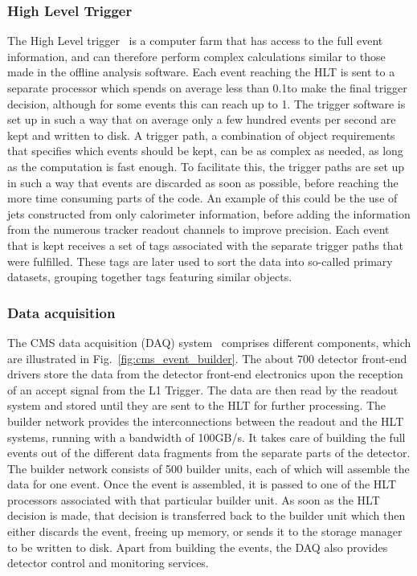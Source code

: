 \subsubsection{High Level Trigger \label{sec:cms_hlt}}

The High Level trigger~\cite{Adam:2005zf} is a computer farm that has access to the full event
information, and can therefore perform complex calculations similar to those made in the offline
analysis software. 
Each event reaching the HLT is sent to a separate processor which spends on average less than
0.1\second to make the final trigger decision, although for some events this can reach up to
1\second. 
The trigger software is set up in such a way that on average only a few hundred events per second
are kept and written to disk. 
A trigger path, a combination of object requirements that specifies which events should
be kept, can be as complex as needed, as long as the computation is fast enough. 
To facilitate this, the trigger paths are set up in such a way that events are discarded as soon as
possible, before reaching the more time consuming parts of the code. 
An example of this could be the use of jets constructed from only calorimeter information, before
adding the information from the numerous tracker readout channels to improve precision. 
Each event that is kept receives a set of tags associated with the separate trigger paths that were
fulfilled. These tags are later used to sort the data into so-called primary datasets, grouping
together tags featuring similar objects. 


\subsubsection{Data acquisition \label{sec:cms_daq}}

The CMS data acquisition (DAQ) system~\cite{Cittolin:578006} comprises different components, which
are illustrated in Fig.~\ref{fig:cms_event_builder}. 
The about 700 detector front-end drivers store the data from the detector front-end electronics upon
the reception of an accept signal from the L1 Trigger. The data are then read by the readout system
and stored until they are sent to the HLT for further processing. 
The builder network provides the interconnections between the readout and the HLT systems, running
with a bandwidth of 100\unit{GB/s}. It takes care of building the full events out of the different
data fragments from the separate parts of the detector. The builder network consists of 500 builder
units, each of which will assemble the data for one event. 
Once the event is assembled, it is passed to one of the HLT processors associated with that
particular builder unit. 
As soon as the HLT decision is made, that decision is transferred back to the builder
unit which then either discards the event, freeing up memory, or sends it to the storage
manager to be written to disk.
Apart from building the events, the DAQ also provides detector control and monitoring services.

